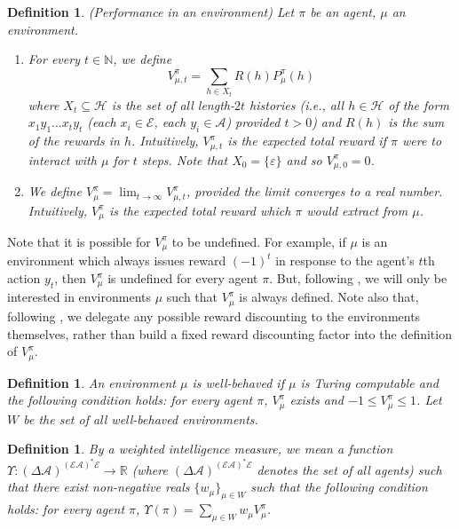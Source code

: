 \documentclass[twoside]{article}
\newtheorem{definition}[theorem]{Definition}
\begin{document}
\begin{definition}
\label{performancedefn}
    (Performance in an environment)
    Let $\pi$ be an agent, $\mu$ an environment.
    \begin{enumerate}
    \item
        For every $t\in\mathbb N$,
        we define
        \[
            V^\pi_{\mu,t}=\sum_{h\in X_t}R(h)P^\pi_\mu(h)
        \]
        where $X_t\subseteq\mathcal H$ is the set of all
        length-$2t$ histories (i.e., all $h\in\mathcal H$ of the form
        $x_1y_1\ldots x_ty_t$ (each $x_i\in\mathcal E$, each $y_i\in\mathcal A$)
        provided $t>0$) and $R(h)$ is the sum of the rewards in $h$.
        Intuitively, $V^\pi_{\mu,t}$ is the expected total reward
        if $\pi$ were to interact with $\mu$ for $t$ steps.
        Note that $X_0=\{\varepsilon\}$ and so $V^\pi_{\mu,0}=0$.
    \item
        We define $V^\pi_\mu=\lim_{t\to\infty}V^\pi_{\mu,t}$,
        provided the limit converges to a real number.
        Intuitively, $V^\pi_\mu$ is the expected total reward which $\pi$ would extract
        from $\mu$.
    \end{enumerate}
\end{definition}

Note that it is possible for $V^\pi_\mu$ to be undefined.
For example, if $\mu$ is an environment which always issues
reward $(-1)^t$ in response to the agent's $t$th action $y_t$,
then $V^\pi_\mu$ is undefined for every agent $\pi$.
But, following \cite{legg2007universal}, we will only be interested in
environments $\mu$ such that $V^\pi_\mu$
is always defined. Note also that, following \cite{legg2007universal},
we delegate any possible reward discounting to the environments themselves,
rather than build a fixed reward discounting factor into the definition
of $V^\pi_\mu$.

\begin{definition}
\label{wellbehaveddefn}
    An environment $\mu$ is \emph{well-behaved} if $\mu$ is Turing
    computable and the following
    condition holds: for every agent $\pi$, $V^\pi_\mu$ exists and
    $-1\leq V^\pi_\mu\leq 1$. Let $W$ be the set of all well-behaved environments.
\end{definition}

\begin{definition}
\label{performanceaveragerdefn}
    By a \emph{weighted intelligence measure}, we mean a function
    $
        \Upsilon:
        (\Delta\mathcal A)^{(\mathcal E\mathcal A)^*\mathcal E}
        \to
        \mathbb R
    $
    (where
    $(\Delta\mathcal A)^{(\mathcal E\mathcal A)^*\mathcal E}$ denotes the set of all agents)
    such that there exist non-negative reals $\{w_\mu\}_{\mu\in W}$ such that the following
    condition holds:
    for every agent $\pi$, $\Upsilon(\pi)=\sum_{\mu\in W}w_\mu V^\pi_\mu$.
\end{definition}
\end{document}
